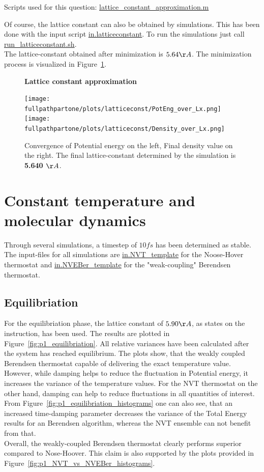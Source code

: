 \documentclass[10pt,a4paper]{report}
\def \pathpartone {../../1_three-dimensional_atomic_system}
\def \fullpathpartone {/home/lukas/Desktop/project/independence/atomistic_modeling/exam/1_three-dimensional_atomic_system}
\newcommand*{\figuretitle}[1]{%
    {\centering%
    \textbf{#1}%
    \par\medskip}%
}
\begin{document}
Scripts used for this question:
\href{../../lattice_constant_approximation.m}{lattice\_constant\_approximation.m}


Of course, the lattice constant can also be obtained by simulations. This has been done with the input script \href{../../DIR1/in.latticeconstant}{in.latticeconstant}. To run the simulations just call \href{../../DIR1/run_latticeconstant.sh}{run\_latticeconstant.sh}.\\
The lattice-constant obtained after minimization is $5.64 \AA$. The minimization process is visualized in Figure~\ref{fig:p1_latticeconst}.

\begin{center}
\begin{figure}[h]
\figuretitle{Lattice constant approximation}
\texttt{[image: \\fullpathpartone/plots/latticeconst/PotEng\_over\_Lx.png]}~
\texttt{[image: \\fullpathpartone/plots/latticeconst/Density\_over\_Lx.png]}~
\caption[Lattice constant determination - convergence]{Convergence of Potential energy on the left, Final density value on the right. The final lattice-constant determined by the simulation is \textbf{5.640 $\AA$}. }
\label{fig:p1_latticeconst}
\end{figure}
\end{center}


\section{Constant temperature and molecular dynamics}
Through several simulations, a timestep of $10 fs$ has been determined as stable. The input-files for all simulations are \href{\pathpartone/in.NVT_template}{in.NVT\_template} for the Noose-Hover thermostat and \href{\pathpartone/in.NVEBer_template}{in.NVEBer\_template} for the "weak-coupling" Berendsen thermostat.

\subsection{Equilibriation}
For the equilibriation phase, the lattice constant of $5.90 \AA$, as states on the instruction, has been used. The results are plotted in Figure~\ref{fig:p1_equilibriation}. All relative variances have been calculated after the system has reached equilibrium. The plots show, that the weakly coupled Berendsen thermostat capable of delivering the exact temperature value. However, while damping helps to reduce the fluctuation in Potential energy, it increases the variance of the temperature values. For the NVT thermostat on the other hand, damping can help to reduce fluctuations in all quantities of interest.\\
From Figure~\ref{fig:p1_equilibriation_histograms} one can also see, that an increased time-damping parameter decreases the variance of the Total Energy results for an Berendsen algorithm, whereas the NVT ensemble can not benefit from that.\\
Overall, the weakly-coupled Berendsen thermostat clearly performs superior compared to Nose-Hoover. This claim is also supported by the plots provided in Figure~\ref{fig:p1_NVT_vs_NVEBer_histograms}.
\end{document}
